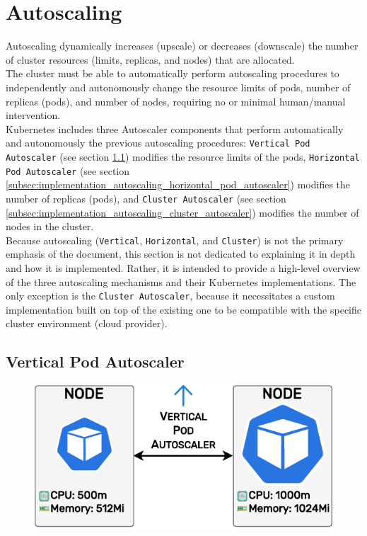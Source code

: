 \section{Autoscaling}
\label{sec:implementation_autoscaling}

Autoscaling dynamically increases (upscale) or decreases (downscale) the number
of cluster resources (limits, replicas, and nodes) that are allocated. \\ %

The cluster must be able to automatically perform autoscaling procedures to independently
and autonomously change the resource limits of pods, number of replicas (pods), and
number of nodes, requiring no or minimal human/manual intervention. \\ %
Kubernetes includes three Autoscaler components that perform automatically and
autonomously the previous autoscaling procedures: \texttt{Vertical Pod Autoscaler}
(see section \ref{subsec:implementation_autoscaling_vertical_pod_autoscaler})
modifies the resource limits of the pods, \texttt{Horizontal Pod Autoscaler} (see
section \ref{subsec:implementation_autoscaling_horizontal_pod_autoscaler})
modifies the number of replicas (pods), and \texttt{Cluster Autoscaler} (see section
\ref{subsec:implementation_autoscaling_cluster_autoscaler}) modifies the number
of nodes in the cluster. \\ %

Because autoscaling (\texttt{Vertical}, \texttt{Horizontal}, and \texttt{Cluster})
is not the primary emphasis of the document, this section is not dedicated to explaining
it in depth and how it is implemented. Rather, it is intended to provide a high-level
overview of the three autoscaling mechanisms and their Kubernetes implementations.
The only exception is the \texttt{Cluster Autoscaler}, because it necessitates a
custom implementation built on top of the existing one to be compatible with the
specific cluster environment (cloud provider).

\subsection{Vertical Pod Autoscaler}
\label{subsec:implementation_autoscaling_vertical_pod_autoscaler}

\begin{figure}
  \centering
  \includegraphics[width=\linewidth]{
    images/implementation/vertical_pod_autoscaler.pdf
  }
\end{figure}

